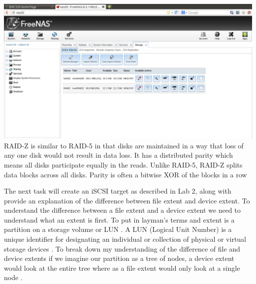 \newline
\includegraphics[width=\textwidth]{5.png}
\newline
RAID-Z is similar to RAID-5 in that disks are maintained in a way that loss of any one disk would not result in data loss. It has a distributed parity which means all disks participate equally in the reads. Unlike RAID-5, RAID-Z splits data blocks across all disks. Parity is often a bitwise XOR of the blocks in a row \cite{raidz}


The next task will create an iSCSI target as described in Lab 2, along with provide an explanation of the difference between file extent and device extent.
To understand the difference between a file extent and a device extent we need to understand what an extent is first. To put in layman's terms and extent is a partition on a storage volume or LUN \cite{extent}. A LUN (Logical Unit Number) is a unique identifier for designating an individual or collection of physical or virtual storage devices \cite{lun}.
To break down my understanding of the difference of file and device extents if we imagine our partition as a tree of nodes, a device extent would look at the entire tree where as a file extent would only look at a single node \cite{extent2}.

